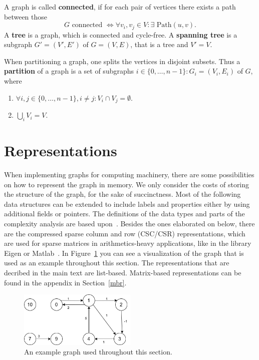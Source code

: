        A graph is called \textbf{connected}, if for each pair of vertices there exists a path between those
        \[G \text{ connected } \Leftrightarrow \forall v_i, v_j \in V: \exists \text{ Path}(u, v).\]
        A \textbf{tree} is a graph, which is connected and cycle-free. 
        A \textbf{spanning tree} is a subgraph $G' = (V', E')$ of $G = (V, E)$, that is a tree and $V' = V$. 
        
        When partitioning a graph, one splits the vertices in disjoint subsets. 
        Thus a \textbf{partition} of a graph is a set of subgraphs $i\in \{0, \dots, n-1\}: G_i = (V_i, E_i)$ of $G$, where 
        \begin{enumerate}
            \item $\forall i,j \in \{0, \dots, n-1\}, i \neq j: V_i \cap V_j = \emptyset$.
            \item $\bigcup_i V_i = V$.
        \end{enumerate}
            
    \section{Representations}\label{\positionnumber}
        When implementing graphs for computing machinery, there are some possibilities on how to represent the graph in memory.
        We only consider the costs of storing the structure of the graph, for the sake of succinctness. 
        Most of the following data structures can be extended to include labels and properties either by using additional fields or pointers. 
        The definitions of the data types and parts of the complexity analysis are based upon~\autocite{Gross1998GraphTA, aho1974design, cormen2009introduction, Goodrich2014AlgorithmDA, steinhaus2010g}. 
        Besides the ones elaborated on below, there are the compressed sparse column and row (CSC/CSR) representations, which are used for sparse matrices in arithmetics-heavy applications, like in the library Eigen or Matlab~\autocite{steinhaus2010g, Eisenstat1982YaleSM}. In Figure~\ref{data_struct-ex} you can see a visualization of the graph that is used as an example throughout this section. The representations that are decribed in the main text are list-based. Matrix-based representations can be found in the appendix in Section~\ref{mbr}.
        
        \begin{figure}[htp]
            \begin{center}
                \includegraphics[keepaspectratio,width=0.5\textwidth]{img/03-graphs/data_struct_gr.png}
            \end{center}
            \caption{An example graph used throughout this section.} 
            \label{data_struct-ex}
        \end{figure}
        

